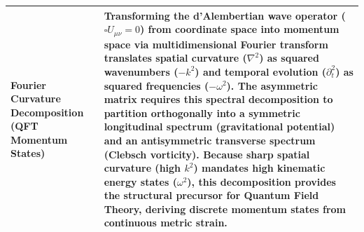 \begin{longtable}{p{} p{}}
    \textbf{Fourier Curvature Decomposition (QFT Momentum States)} & Transforming the d'Alembertian wave operator ($\square \hat{U}_{\mu\nu} = 0$) from coordinate space into momentum space via multidimensional Fourier transform translates spatial curvature ($\nabla^2$) as squared wavenumbers ($-k^2$) and temporal evolution ($\partial_t^2$) as squared frequencies ($-\omega^2$). The asymmetric matrix requires this spectral decomposition to partition orthogonally into a symmetric longitudinal spectrum (gravitational potential) and an antisymmetric transverse spectrum (Clebsch vorticity). Because sharp spatial curvature (high $k^2$) mandates high kinematic energy states ($\omega^2$), this decomposition provides the structural precursor for Quantum Field Theory, deriving discrete momentum states from continuous metric strain. \\ 
    \hline
\end{longtable}
\newpage

